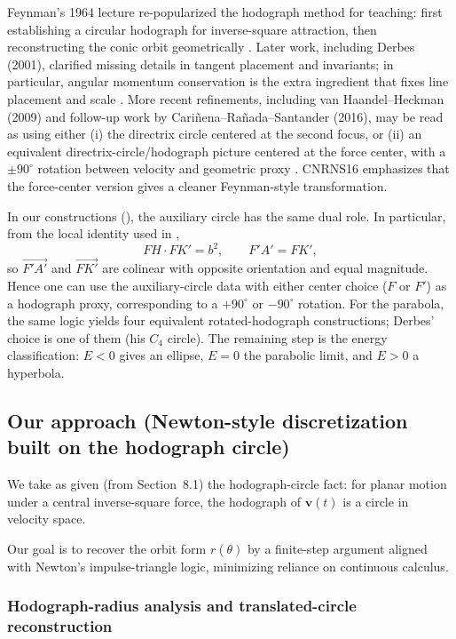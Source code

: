 Feynman's 1964 lecture re-popularized the hodograph method for teaching: first establishing a circular hodograph for inverse-square attraction, then reconstructing the conic orbit geometrically \cite{goodstein1996feynman}. Later work, including Derbes (2001), clarified missing details in tangent placement and invariants; in particular, angular momentum conservation is the extra ingredient that fixes line placement and scale \cite{derbes2001reinventing}. More recent refinements, including van Haandel--Heckman (2009) and follow-up work by Cari\~nena--Ra\~nada--Santander (2016), may be read as using either (i) the directrix circle centered at the second focus, or (ii) an equivalent directrix-circle/hodograph picture centered at the force center, with a $\pm 90^\circ$ rotation between velocity and geometric proxy \cite{vanhaandelheckman2009teaching,carinena2016newlook}. CNRNS16 emphasizes that the force-center version gives a cleaner Feynman-style transformation.

In our constructions (), the auxiliary circle has the same dual role. In particular, from the local identity used in ,
\[
  FH\cdot FK' = b^2,
  \qquad
  F'\!A' = FK',
\]
so $\overrightarrow{F'\!A'}$ and $\overrightarrow{FK'}$ are colinear with opposite orientation and equal magnitude. Hence one can use the auxiliary-circle data with either center choice ($F$ or $F'$) as a hodograph proxy, corresponding to a $+90^\circ$ or $-90^\circ$ rotation. For the parabola, the same logic yields four equivalent rotated-hodograph constructions; Derbes' choice is one of them (his $C_4$ circle). The remaining step is the energy classification: $E<0$ gives an ellipse, $E=0$ the parabolic limit, and $E>0$ a hyperbola.

\subsection{Our approach (Newton-style discretization built on the hodograph circle)}

We take as given (from Section~8.1) the hodograph-circle fact: for planar motion under a central inverse-square force, the hodograph of $\mathbf v(t)$ is a circle in velocity space.

Our goal is to recover the orbit form $r(\theta)$ by a finite-step argument aligned with Newton's impulse-triangle logic, minimizing reliance on continuous calculus.

\subsubsection{Hodograph-radius analysis and translated-circle reconstruction}

